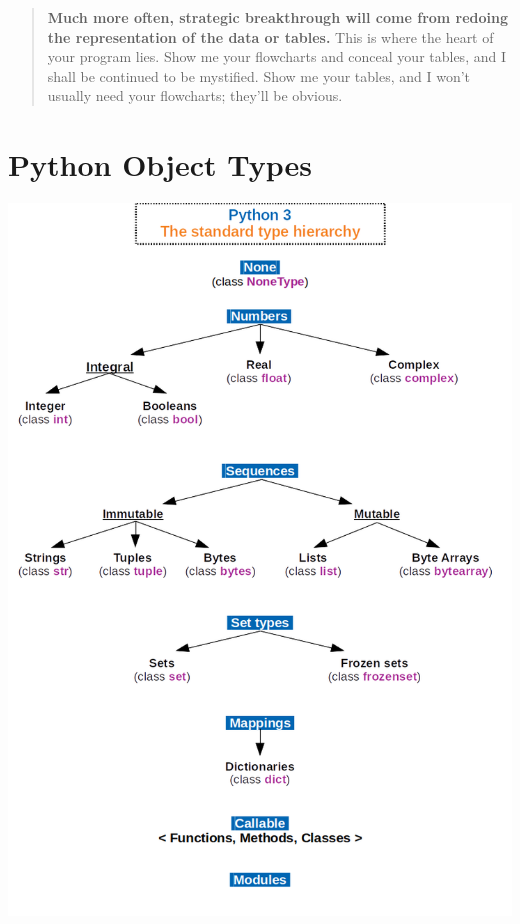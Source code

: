 \documentclass[
  letterpaper,
  DIV=11,
  numbers=noendperiod]{scrreport}
\begin{document}
\begin{quote}
\textbf{Much more often, strategic breakthrough will come from redoing
the representation of the data or tables.} This is where the heart of
your program lies. Show me your flowcharts and conceal your tables, and
I shall be continued to be mystified. Show me your tables, and I won't
usually need your flowcharts; they'll be obvious.
\end{quote}

\hypertarget{python-object-types}{%
\chapter{Python Object Types}\label{python-object-types}}

\includegraphics{topics/media/Python_3._The_standard_type_hierarchy.png}
\end{document}
